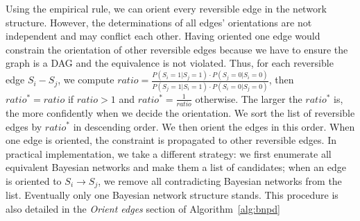 \documentclass{edm_template}
\begin{document}
Using the empirical rule, we can orient every reversible edge in the network structure. 
However, the determinations of all edges' orientations are not independent and may conflict each other.
Having oriented one edge would constrain the orientation of other reversible edges because we have to ensure the graph is a DAG and the equivalence is not violated.
Thus, for each reversible edge $S_i-S_j$, we compute $ratio=\frac{P(S_i=1|S_j=1)\cdot P(S_j=0|S_i=0)}{P(S_j=1|S_i=1)\cdot P(S_i=0|S_j=0)}$,
then  $ratio^*=ratio$ if $ratio >1$ and $ratio^*=\frac{1}{ratio}$ otherwise. The larger the $ratio^*$ is, the more confidently when we decide the orientation.
We sort the list of reversible edges by $ratio^*$ in descending order. We then orient the edges in this order.
When one edge is oriented, the constraint is propagated to other reversible edges. In practical implementation, we take a different strategy: 
we first enumerate all equivalent Bayesian networks and make them a list of candidates; 
when an edge is oriented to $S_i\rightarrow S_j$, we remove all contradicting Bayesian networks from the list.
Eventually only one Bayesian network structure stands. This procedure is also detailed in the \emph{Orient edges} section of Algorithm~\ref{alg:bnpd}  
\end{document}
